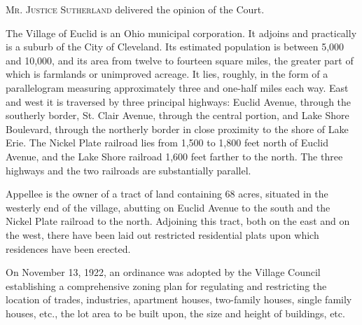 

\opinion \textsc{Mr. Justice Sutherland} delivered the opinion of the Court.

The Village of Euclid is an Ohio municipal corporation. It adjoins and
practically is a suburb of the City of Cleveland. Its estimated population is
between 5,000 and 10,000, and its area from twelve to fourteen square miles, the
greater part of which is farmlands or unimproved acreage. It lies, roughly, in
the form of a parallelogram measuring approximately three and one-half miles
each way. East and west it is traversed by three principal highways: Euclid
Avenue, through the southerly border, St. Clair Avenue, through the central
portion, and Lake Shore Boulevard, through the northerly border in close
proximity to the shore of Lake Erie. The Nickel Plate railroad lies from 1,500
to 1,800 feet north of Euclid Avenue, and the Lake Shore railroad 1,600 feet
farther to the north. The three highways and the two railroads are substantially
parallel.

Appellee is the owner of a tract of land containing 68 acres, situated in the
westerly end of the village, abutting on Euclid Avenue to the south and the
Nickel Plate railroad to the north. Adjoining this tract, both on the east and
on the west, there have been laid out restricted residential plats upon which
residences have been erected.

On November 13, 1922, an ordinance was adopted by the Village Council
establishing a comprehensive zoning plan for regulating and restricting the
location of trades, industries, apartment houses, two-family houses, single
family houses, etc., the lot area to be built upon, the size and height of
buildings, etc.

